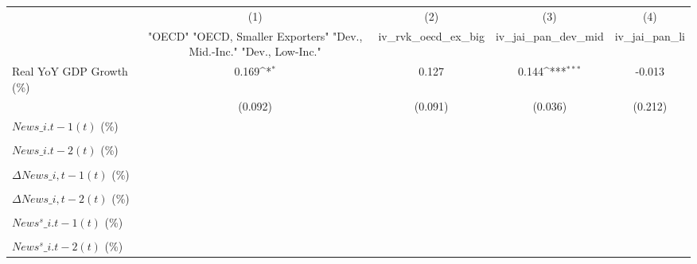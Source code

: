 {
\def\sym#1{\ifmmode^{#1}\else\(^{#1}\)\fi}
\begin{tabular}{l*{4}{c}}
\toprule
                    &\multicolumn{1}{c}{(1)}&\multicolumn{1}{c}{(2)}&\multicolumn{1}{c}{(3)}&\multicolumn{1}{c}{(4)}\\
                    &\multicolumn{1}{c}{ "OECD" "OECD, Smaller Exporters" "Dev., Mid.-Inc." "Dev., Low-Inc."}&\multicolumn{1}{c}{iv\_rvk\_oecd\_ex\_big}&\multicolumn{1}{c}{iv\_jai\_pan\_dev\_mid}&\multicolumn{1}{c}{iv\_jai\_pan\_li}\\
\midrule
Real YoY GDP Growth (\%)&       0.169\sym{*}  &       0.127         &       0.144\sym{***}&      -0.013         \\
                    &     (0.092)         &     (0.091)         &     (0.036)         &     (0.212)         \\
\addlinespace
$ News\_{i.t-1}(t)$ (\%)&                     &                     &                     &                     \\
                    &                     &                     &                     &                     \\
\addlinespace
$ News\_{i.t-2}(t)$ (\%)&                     &                     &                     &                     \\
                    &                     &                     &                     &                     \\
\addlinespace
$ \Delta News\_{i,t-1}(t)$ (\%)&                     &                     &                     &                     \\
                    &                     &                     &                     &                     \\
\addlinespace
$ \Delta News\_{i,t-2}(t)$ (\%)&                     &                     &                     &                     \\
                    &                     &                     &                     &                     \\
\addlinespace
$ News^s\_{i.t-1}(t)$ (\%)&                     &                     &                     &                     \\
                    &                     &                     &                     &                     \\
\addlinespace
$ News^s\_{i.t-2}(t)$ (\%)&                     &                     &                     &                     \\

\end{tabular}}
